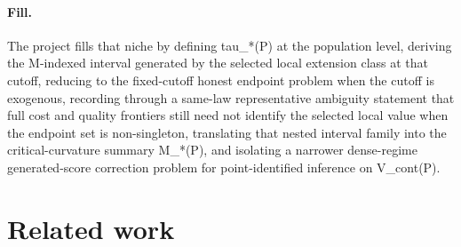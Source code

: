 \documentclass{article}
\begin{document}
\paragraph{Fill.} The project fills that niche by defining tau_*(P) at the population level, deriving the M-indexed interval generated by the selected local extension class at that cutoff, reducing to the fixed-cutoff honest endpoint problem when the cutoff is exogenous, recording through a same-law representative ambiguity statement that full cost and quality frontiers still need not identify the selected local value when the endpoint set is non-singleton, translating that nested interval family into the critical-curvature summary M_*(P), and isolating a narrower dense-regime generated-score correction problem for point-identified inference on V_cont(P).

\section{Related work}
\end{document}

